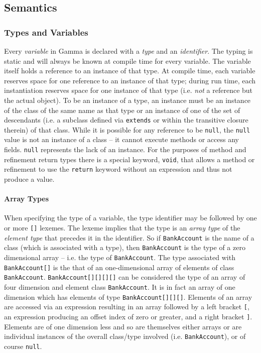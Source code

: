 \subsection{Semantics}

\subsubsection{Types and Variables}
Every \textit{variable} in Gamma is declared with a \textit{type} and an \textit{identifier}. The typing is static and will always be known at compile time for every variable. The variable itself holds a reference to an instance of that type. At compile time, each variable reserves space for one reference to an instance of that type; during run time, each instantiation reserves space for one instance of that type (i.e. \emph{not} a reference but the actual object). To be an instance of a type, an instance must be an instance of the class of the same name as that type or an instance of one of the set of descendants (i.e. a subclass defined via \verb!extends! or within the transitive closure therein) of that class. While it is possible for any reference to be \verb!null!, the \verb!null! value is not an instance of a class -- it cannot execute methods or access any fields. \verb!null! represents the lack of an instance. For the purposes of method and refinement return types there is a special keyword, \verb!void!, that allows a method or refinement to use the \verb!return! keyword without an expression and thus not produce a value.

\paragraph{Array Types}
When specifying the type of a variable, the type identifier may be followed by one or more \verb![]! lexemes. The lexeme implies that the type is an \textit{array type} of the \textit{element type} that precedes it in the identifier. So if \verb!BankAccount! is the name of a class (which is associated with a type), then \verb!BankAccount! is the type of a zero dimensional array -- i.e. the type of \verb!BankAccount!. The type associated with \verb!BankAccount[]! is the that of an one-dimensional array of elements of class \verb!BankAccount!. \verb!BankAccount[][][][]! can be considered the type of an array of four dimension and element class \verb!BankAccount!. It is in fact an array of one dimension which has elements of type \verb!BankAccount[][][]!. Elements of an array are accessed via an expression resulting in an array followed by a left bracket \verb![!, an expression producing an offset index of zero or greater, and a right bracket \verb!]!. Elements are of one dimension less and so are themselves either arrays or are individual instances of the overall class/type involved (i.e. \verb!BankAccount!), or of course \verb!null!.


